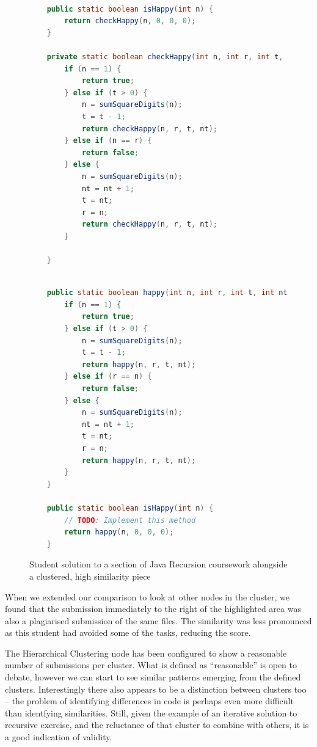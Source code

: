 \begin{figure}[H]
\begin{minipage}[b]{0.45\linewidth}
\begin{lstlisting}[language=Java]

	public static boolean isHappy(int n) {
		return checkHappy(n, 0, 0, 0);
	}

	private static boolean checkHappy(int n, int r, int t, int nt) {
		if (n == 1) {
			return true;
		} else if (t > 0) {
			n = sumSquareDigits(n);
			t = t - 1;
			return checkHappy(n, r, t, nt);
		} else if (n == r) {
			return false;
		} else {
			n = sumSquareDigits(n);
			nt = nt + 1;
			t = nt;
			r = n;
			return checkHappy(n, r, t, nt);
		}

	}
\end{lstlisting}
\end{minipage}
\hspace{0.5cm}
\begin{minipage}[b]{0.45\linewidth}
\begin{lstlisting}[language=Java]

	public static boolean happy(int n, int r, int t, int nt) {
		if (n == 1) {
			return true;
		} else if (t > 0) {
			n = sumSquareDigits(n);
			t = t - 1;
			return happy(n, r, t, nt);
		} else if (r == n) {
			return false;
		} else {
			n = sumSquareDigits(n);
			nt = nt + 1;
			t = nt;
			r = n;
			return happy(n, r, t, nt);
		}
	}

	public static boolean isHappy(int n) {
		// TODO: Implement this method
		return happy(n, 0, 0, 0);
	}

\end{lstlisting}
\end{minipage}
\caption{Student solution to a section of Java Recursion coursework alongside
a clustered, high similarity piece}
\label{code:recursionPlag}
\end{figure}

When we extended our comparison to look at other nodes in the cluster, we found
that the submission immediately to the right of the highlighted area was also
a plagiarised submission of the same files. The similarity was less pronounced
as this student had avoided some of the tasks, reducing the score.

The Hierarchical Clustering node has been configured to show a reasonable number
of submissions per cluster. What is defined as ``reasonable'' is open to debate,
however we can start to see similar patterns emerging from the defined clusters.
Interestingly there also appears to be a distinction between clusters too --
the problem of identifying differences in code is perhaps even more difficult
than identfying similarities. Still, given the example of an iterative solution
to recursive exercise, and the reluctance of that cluster to combine with others,
it is a good indication of validity.

